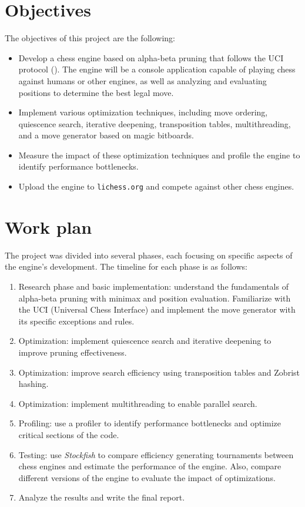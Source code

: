 \noindent 

\section{Objectives}
\label{sec:objectives}

\noindent The objectives of this project are the following:

\begin{itemize}
    \item Develop a chess engine based on alpha-beta pruning that follows the UCI protocol (\cite{UciProtocol}). The engine will be a console application capable of playing chess against humans or other engines, as well as analyzing and evaluating positions to determine the best legal move.
    \item Implement various optimization techniques, including move ordering, quiescence search, iterative deepening, transposition tables, multithreading, and a move generator based on magic bitboards.
    \item Measure the impact of these optimization techniques and profile the engine to identify performance bottlenecks.
    \item Upload the engine to \texttt{lichess.org} and compete against other chess engines.
\end{itemize}

\section{Work plan}

The project was divided into several phases, each focusing on specific aspects of the engine's development. The timeline for each phase is as follows:

\begin{enumerate}
    \item Research phase and basic implementation: understand the fundamentals of alpha-beta pruning with minimax and position evaluation. Familiarize with the UCI (Universal Chess Interface) and implement the move generator with its specific exceptions and rules.
    \item Optimization: implement quiescence search and iterative deepening to improve pruning effectiveness.
    \item Optimization: improve search efficiency using transposition tables and Zobrist hashing.
    \item Optimization: implement multithreading to enable parallel search.
    \item Profiling: use a profiler to identify performance bottlenecks and optimize critical sections of the code.
    \item Testing: use \textit{Stockfish} to compare efficiency generating tournaments between chess engines and estimate the performance of the engine. Also, compare different versions of the engine to evaluate the impact of optimizations.
    \item Analyze the results and write the final report.
\end{enumerate}

